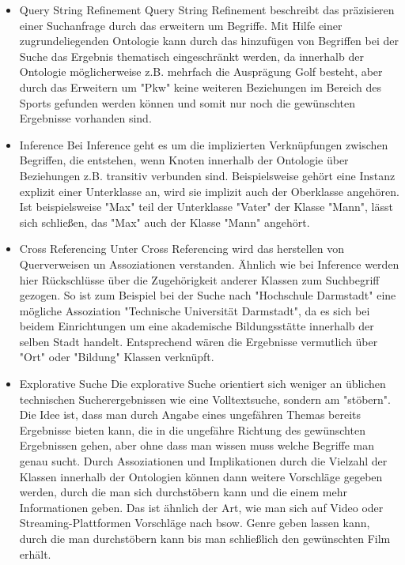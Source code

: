 \begin{itemize}
    \item Query String Refinement\newline
          Query String Refinement beschreibt das präzisieren einer Suchanfrage durch das erweitern um Begriffe. Mit Hilfe einer zugrundeliegenden Ontologie kann durch das hinzufügen von Begriffen bei der Suche das Ergebnis thematisch eingeschränkt werden, da innerhalb der Ontologie möglicherweise z.B. mehrfach die Ausprägung Golf besteht, aber durch das Erweitern um "Pkw" keine weiteren Beziehungen im Bereich des Sports gefunden werden können und somit nur noch die gewünschten Ergebnisse vorhanden sind. 
    \item Inference\newline
          Bei Inference geht es um die implizierten Verknüpfungen zwischen Begriffen, die entstehen, wenn Knoten innerhalb der Ontologie über Beziehungen z.B. transitiv verbunden sind. Beispielsweise gehört eine Instanz explizit einer Unterklasse an, wird sie implizit auch der Oberklasse angehören. Ist beispielsweise "Max" teil der Unterklasse "Vater" der Klasse "Mann", lässt sich schließen, das "Max" auch der Klasse "Mann" angehört.
    \item Cross Referencing\newline
          Unter Cross Referencing wird das herstellen von Querverweisen un Assoziationen verstanden. Ähnlich wie bei Inference werden hier Rückschlüsse über die Zugehörigkeit anderer Klassen zum Suchbegriff gezogen. So ist zum Beispiel bei der Suche nach "Hochschule Darmstadt" eine mögliche Assoziation "Technische Universität Darmstadt", da es sich bei beidem Einrichtungen um eine akademische Bildungsstätte innerhalb der selben Stadt handelt. Entsprechend wären die Ergebnisse vermutlich über "Ort" oder "Bildung" Klassen verknüpft.
    \item Explorative Suche\newline
          Die explorative Suche orientiert sich weniger an üblichen technischen Sucherergebnissen wie eine Volltextsuche, sondern am "stöbern". Die Idee ist, dass man durch Angabe eines ungefähren Themas bereits Ergebnisse bieten kann, die in die ungefähre Richtung des gewünschten Ergebnissen gehen, aber ohne dass man wissen muss welche Begriffe man genau sucht. Durch Assoziationen und Implikationen durch die Vielzahl der Klassen innerhalb der Ontologien können dann weitere Vorschläge gegeben werden, durch die man sich durchstöbern kann und die einem mehr Informationen geben. Das ist ähnlich der Art, wie man sich auf Video oder Streaming-Plattformen Vorschläge nach bsow. Genre geben lassen kann, durch die man durchstöbern kann bis man schließlich den gewünschten Film erhält.
          \cite{Sack.2010}
\end{itemize}
